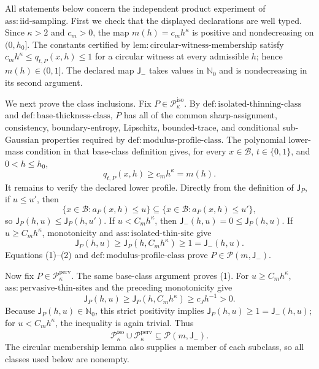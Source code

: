 All statements below concern the independent product experiment of \(\mathrm{ass:iid\text{-}sampling}\).  First we check that the displayed declarations are well typed.  Since \(\kappa>2\) and \(c_m>0\), the map \(m(h)=c_mh^\kappa\) is positive and nondecreasing on \((0,h_0]\).  The constants certified by \(\mathrm{lem:circular\text{-}witness\text{-}membership}\) satisfy \(c_mh^\kappa\le q_{t,P}(x,h)\le1\) for a circular witness at every admissible \(h\); hence \(m(h)\in(0,1]\).  The declared map \(\mathsf J_-\) takes values in \(\mathbb N_0\) and is nondecreasing in its second argument.

We next prove the class inclusions.  Fix \(P\in\mathcal P_\kappa^{\mathrm{iso}}\).  By \(\mathrm{def:isolated\text{-}thinning\text{-}class}\) and \(\mathrm{def:base\text{-}thickness\text{-}class}\), \(P\) has all of the common sharp-assignment, consistency, boundary-entropy, Lipschitz, bounded-trace, and conditional sub-Gaussian properties required by \(\mathrm{def:modulus\text{-}profile\text{-}class}\).  The polynomial lower-mass condition in that base-class definition gives, for every \(x\in\mathcal B\), \(t\in\{0,1\}\), and \(0<h\le h_0\),
\[
 q_{t,P}(x,h)\ge c_mh^\kappa=m(h). \tag{1}
\]
It remains to verify the declared lower profile.  Directly from the definition of \(\mathsf J_P\), if \(u\le u'\), then
\[
 \{x\in\mathcal B:a_P(x,h)\le u\}
 \subseteq
 \{x\in\mathcal B:a_P(x,h)\le u'\},
\]
so \(\mathsf J_P(h,u)\le\mathsf J_P(h,u')\).  If \(u<C_mh^\kappa\), then \(\mathsf J_-(h,u)=0\le\mathsf J_P(h,u)\).  If \(u\ge C_mh^\kappa\), monotonicity and \(\mathrm{ass:isolated\text{-}thin\text{-}site}\) give
\[
 \mathsf J_P(h,u)
 \ge \mathsf J_P(h,C_mh^\kappa)
 \ge1
 =\mathsf J_-(h,u). \tag{2}
\]
Equations (1)--(2) and \(\mathrm{def:modulus\text{-}profile\text{-}class}\) prove \(P\in\mathcal P(m,\mathsf J_-)\).

Now fix \(P\in\mathcal P_\kappa^{\mathrm{perv}}\).  The same base-class argument proves (1).  For \(u\ge C_mh^\kappa\), \(\mathrm{ass:pervasive\text{-}thin\text{-}sites}\) and the preceding monotonicity give
\[
 \mathsf J_P(h,u)
 \ge \mathsf J_P(h,C_mh^\kappa)
 \ge c_Jh^{-1}>0.
\]
Because \(\mathsf J_P(h,u)\in\mathbb N_0\), this strict positivity implies \(\mathsf J_P(h,u)\ge1=\mathsf J_-(h,u)\); for \(u<C_mh^\kappa\), the inequality is again trivial.  Thus
\[
 \mathcal P_\kappa^{\mathrm{iso}}\cup
 \mathcal P_\kappa^{\mathrm{perv}}
 \subseteq \mathcal P(m,\mathsf J_-). \tag{3}
\]
The circular membership lemma also supplies a member of each subclass, so all classes used below are nonempty.


